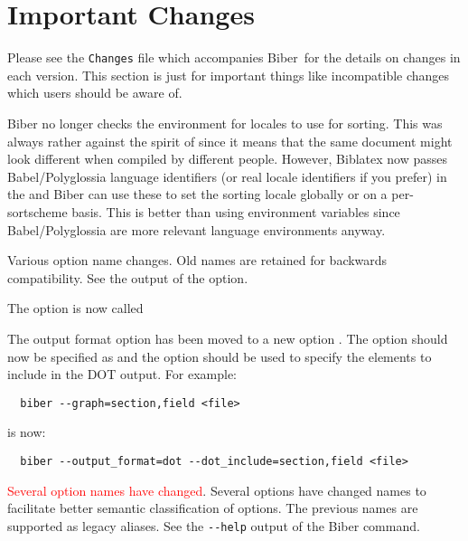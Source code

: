 \documentclass{ltxdockit}
\newcommand*{\biber}{Biber\xspace}
\newcommand*{\biblatex}{Biblatex\xspace}
\begin{document}
\printtitlepage
\tableofcontents

\section{Important Changes}\label{special}

Please see the \verb+Changes+ file which accompanies \biber\ for the
details on changes in each version. This section is just for important
things like incompatible changes which users should be aware of.

\biber no longer checks the environment for locales to use for sorting. This
was always rather against the spirit of \tex since it means that the same
document might look different when compiled by different people. However,
\biblatex now passes Babel/Polyglossia language identifiers (or real locale
identifiers if you prefer) in the  and \biber can use these to
set the sorting locale globally or on a per-sortscheme basis. This is better
than using environment variables since Babel/Polyglossia are more \latex
relevant language environments anyway.

Various option name changes. Old names are retained for backwards
compatibility. See the output of the  option.

The  option is now called 

The output format option  has been moved to a
new option . The option  should now be
specified as  and the \linebreak{} option
should be used to specify the elements to include in the DOT output. For
example:

\begin{verbatim}
  biber --graph=section,field <file>
\end{verbatim}

\noindent is now:

\begin{verbatim}
  biber --output_format=dot --dot_include=section,field <file>
\end{verbatim}

\textcolor{red}{Several option names have changed}. Several options have
changed names to facilitate better semantic classification of options. The
previous names are supported as legacy aliases. See the \verb+--help+
output of the \biber command.
\end{document}
